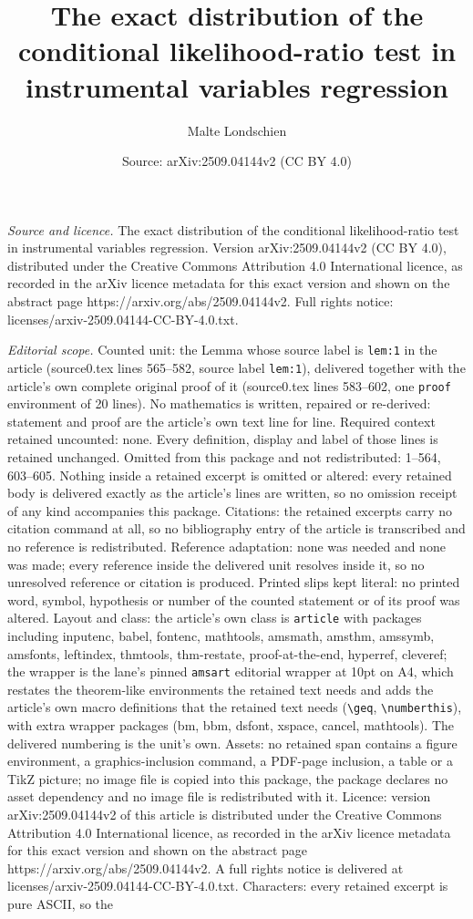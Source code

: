 \documentclass[10pt,a4paper]{amsart}
\title[The exact distribution of the conditional likelihood-ratio t]{The exact distribution of the conditional likelihood-ratio test in instrumental variables regression}
\author{Malte Londschien}
\date{Source: arXiv:2509.04144v2 (CC BY 4.0)}
\begin{document}
\maketitle

\noindent\emph{Source and licence.} The exact distribution of the conditional likelihood-ratio test in instrumental variables regression. Version arXiv:2509.04144v2 (CC BY 4.0), distributed under the Creative Commons Attribution 4.0 International licence, as recorded in the arXiv licence metadata for this exact version and shown on the abstract page https://arxiv.org/abs/2509.04144v2. Full rights notice: licenses/arxiv-2509.04144-CC-BY-4.0.txt.\par\smallskip

\noindent\textit{Editorial scope.} Counted unit: the Lemma whose source label is \texttt{lem:1} in the article (source0.tex lines 565--582, source label \texttt{lem:1}), delivered together with the article's own complete original proof of it (source0.tex lines 583--602, one \texttt{proof} environment of 20 lines). No mathematics is written, repaired or re-derived: statement and proof are the article's own text line for line. Required context retained uncounted: none. Every definition, display and label of those lines is retained unchanged. Omitted from this package and not redistributed: 1--564, 603--605. Nothing inside a retained excerpt is omitted or altered: every retained body is delivered exactly as the article's lines are written, so no omission receipt of any kind accompanies this package. Citations: the retained excerpts carry no citation command at all, so no bibliography entry of the article is transcribed and no reference is redistributed. Reference adaptation: none was needed and none was made; every reference inside the delivered unit resolves inside it, so no unresolved reference or citation is produced. Printed slips kept literal: no printed word, symbol, hypothesis or number of the counted statement or of its proof was altered. Layout and class: the article's own class is \texttt{article} with packages including inputenc, babel, fontenc, mathtools, amsmath, amsthm, amssymb, amsfonts, leftindex, thmtools, thm-restate, proof-at-the-end, hyperref, cleveref; the wrapper is the lane's pinned \texttt{amsart} editorial wrapper at 10pt on A4, which restates the theorem-like environments the retained text needs and adds the article's own macro definitions that the retained text needs (\texttt{\textbackslash geq}, \texttt{\textbackslash numberthis}), with extra wrapper packages (bm, bbm, dsfont, xspace, cancel, mathtools). The delivered numbering is the unit's own. Assets: no retained span contains a figure environment, a graphics-inclusion command, a PDF-page inclusion, a table or a TikZ picture; no image file is copied into this package, the package declares no asset dependency and no image file is redistributed with it. Licence: version arXiv:2509.04144v2 of this article is distributed under the Creative Commons Attribution 4.0 International licence, as recorded in the arXiv licence metadata for this exact version and shown on the abstract page https://arxiv.org/abs/2509.04144v2. A full rights notice is delivered at licenses/arxiv-2509.04144-CC-BY-4.0.txt. Characters: every retained excerpt is pure ASCII, so the 
\end{document}
